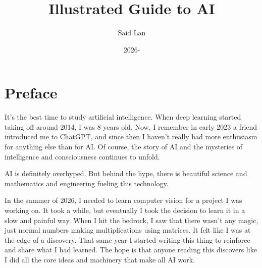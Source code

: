 \documentclass{article}
\title{Illustrated Guide to AI}
\author{Said Lan}
\date{2026-}
\begin{document}
\maketitle

\section{Preface}
{\large It's the best time to study artificial intelligence. When deep learning started taking off around 2014, I was 8 years old. Now, I remember in early 2023 a friend introduced me to ChatGPT, and since then I haven't really had more enthusiasm for anything else than for AI. Of course, the story of AI and the mysteries of intelligence and consciousness continues to unfold.
\\
}

{\large\noindent AI is definitely overhyped. But behind the hype, there is beautiful science and mathematics and engineering fueling this technology.
\\
}

{\large\noindent In the summer of 2026, I needed to learn computer vision for a project I was working on. It took a while, but eventually I took the decision to learn it in a slow and painful way. When I hit the bedrock, I saw that there wasn't any magic, just normal numbers making multiplications using matrices. It felt like I was at the edge of a discovery. That same year I started writing this thing to reinforce and share what I had learned. The hope is that anyone reading this discovers like I did all the core ideas and machinery that make all AI work.}
\end{document}
